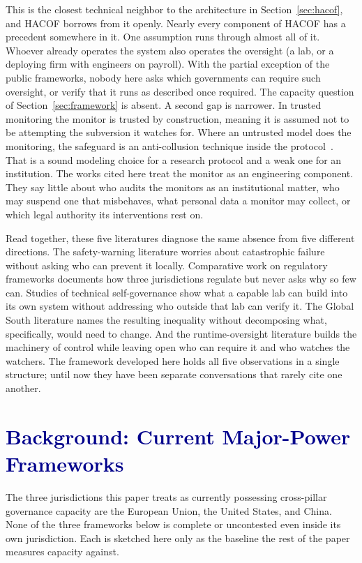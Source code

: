 \documentclass[journal]{IEEEtran}
\newcommand{\hacof}{HACOF}
\begin{document}
This is the closest technical neighbor to the architecture in Section~\ref{sec:hacof}, and \hacof{} borrows from it openly. Nearly every component of \hacof{} has a precedent somewhere in it. One assumption runs through almost all of it. Whoever already operates the system also operates the oversight (a lab, or a deploying firm with engineers on payroll). With the partial exception of the public frameworks, nobody here asks which governments can require such oversight, or verify that it runs as described once required. The capacity question of Section~\ref{sec:framework} is absent. A second gap is narrower. In trusted monitoring the monitor is trusted by construction, meaning it is assumed not to be attempting the subversion it watches for. Where an untrusted model does the monitoring, the safeguard is an anti-collusion technique inside the protocol~\cite{greenblatt2024aicontrol}.
That is a sound modeling choice for a research protocol and a weak one for an institution. The works cited here treat the monitor as an engineering component. They say little about who audits the monitors as an institutional matter, who may suspend one that misbehaves, what personal data a monitor may collect, or which legal authority its interventions rest on.

Read together, these five literatures diagnose the same absence from five different directions. The safety-warning literature worries about catastrophic failure without asking who can prevent it locally. Comparative work on regulatory frameworks documents how three jurisdictions regulate but never asks why so few can. Studies of technical self-governance show what a capable lab can build into its own system without addressing who outside that lab can verify it. The Global South literature names the resulting inequality without decomposing what, specifically, would need to change. And the runtime-oversight literature builds the machinery of control while leaving open who can require it and who watches the watchers. The framework developed here holds all five observations in a single structure; until now they have been separate conversations that rarely cite one another.

\section{\textcolor{darkblue}{Background: Current Major-Power Frameworks}}
\label{sec:background}

The three jurisdictions this paper treats as currently possessing cross-pillar governance capacity are the European Union, the United States, and China. None of the three frameworks below is complete or uncontested even inside its own jurisdiction. Each is sketched here only as the baseline the rest of the paper measures capacity against.
\end{document}
